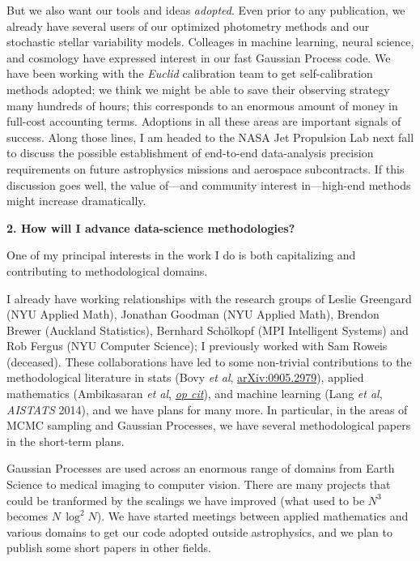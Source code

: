 \documentclass[11pt, letterpaper]{article}
\newcommand{\arxiv}[1]{\href{http://arxiv.org/abs/#1}{arXiv:#1}}
\newcommand{\opcit}[1]{\href{http://arxiv.org/abs/#1}{\textit{op cit}}}
\begin{document}
But we also want our tools and ideas \emph{adopted}.
Even prior to any publication, we already have several users of our
optimized photometry methods and our stochastic stellar variability
models.
Colleages in machine learning, neural science, and cosmology have
expressed interest in our fast Gaussian Process code.
We have been working with the \textsl{Euclid} calibration team to get
self-calibration methods adopted; we think we might be able to save
their observing strategy many hundreds of hours; this corresponds to an
enormous amount of money in full-cost accounting terms.
Adoptions in all these areas are important signals of success.
Along those lines, I am headed to the NASA Jet Propulsion Lab next
fall to discuss the possible establishment of end-to-end data-analysis
precision requirements on future astrophysics missions and aerospace
subcontracts.
If this discussion goes well, the value of---and community interest
in---high-end methods might increase dramatically.

\bigskip
\noindent\textbf{2. How will I advance data-science methodologies?}
\smallskip

One of my principal interests in the work I do is both capitalizing
and contributing to methodological domains.

I already have working relationships with the research groups of
Leslie Greengard (NYU Applied Math), Jonathan Goodman (NYU Applied
Math), Brendon Brewer (Auckland Statistics), Bernhard Sch\"olkopf (MPI
Intelligent Systems) and Rob Fergus (NYU Computer Science); I
previously worked with Sam Roweis (deceased).
These collaborations have led to some non-trivial contributions to
the methodological literature in stats (Bovy \textit{et al},
\arxiv{0905.2979}), applied mathematics (Ambikasaran \textit{et al},
\opcit{1403.6015}), and machine learning (Lang \textit{et al},
\textit{AISTATS} 2014), and we have plans for many more.
In particular, in the areas of MCMC sampling and Gaussian Processes,
we have several methodological papers in the short-term plans.

Gaussian Processes are used across an enormous range of domains from
Earth Science to medical imaging to computer vision.
There are many projects that could be tranformed by the scalings we
have improved (what used to be $N^3$ becomes $N\,\log^2N$).
We have started meetings between applied mathematics and various
domains to get our code adopted outside astrophysics, and we plan to
publish some short papers in other fields.
\end{document}
